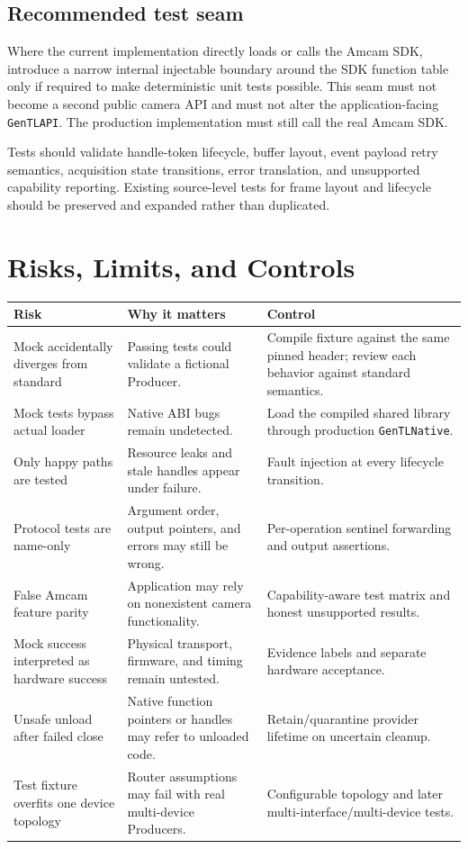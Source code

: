 \documentclass[11pt,a4paper]{report}
\begin{document}
\section{Recommended test seam}
Where the current implementation directly loads or calls the Amcam SDK, introduce a narrow internal injectable boundary around the SDK function table only if required to make deterministic unit tests possible. This seam must not become a second public camera API and must not alter the application-facing \texttt{GenTLAPI}. The production implementation must still call the real Amcam SDK.

Tests should validate handle-token lifecycle, buffer layout, event payload retry semantics, acquisition state transitions, error translation, and unsupported capability reporting. Existing source-level tests for frame layout and lifecycle should be preserved and expanded rather than duplicated.

\chapter{Risks, Limits, and Controls}

\begin{longtable}{p{}p{}p{}}
\toprule
Risk & Why it matters & Control \\
\midrule
Mock accidentally diverges from standard & Passing tests could validate a fictional Producer. & Compile fixture against the same pinned header; review each behavior against standard semantics. \\
Mock tests bypass actual loader & Native ABI bugs remain undetected. & Load the compiled shared library through production \texttt{GenTLNative}. \\
Only happy paths are tested & Resource leaks and stale handles appear under failure. & Fault injection at every lifecycle transition. \\
Protocol tests are name-only & Argument order, output pointers, and errors may still be wrong. & Per-operation sentinel forwarding and output assertions. \\
False Amcam feature parity & Application may rely on nonexistent camera functionality. & Capability-aware test matrix and honest unsupported results. \\
Mock success interpreted as hardware success & Physical transport, firmware, and timing remain untested. & Evidence labels and separate hardware acceptance. \\
Unsafe unload after failed close & Native function pointers or handles may refer to unloaded code. & Retain/quarantine provider lifetime on uncertain cleanup. \\
Test fixture overfits one device topology & Router assumptions may fail with real multi-device Producers. & Configurable topology and later multi-interface/multi-device tests. \\
\bottomrule
\end{longtable}
\end{document}
